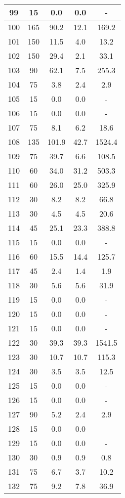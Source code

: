 \documentclass[a4paper,10pt]{article}
\begin{document}
\begin{table}
\begin{tabular}{|c|c|c|c|c|}
\hline
99 & 15 & 0.0 & 0.0 & - \\
\hline
100 & 165 & 90.2 & 12.1 & 169.2 \\
\hline
101 & 150 & 11.5 & 4.0 & 13.2 \\
\hline
102 & 150 & 29.4 & 2.1 & 33.1 \\
\hline
103 & 90 & 62.1 & 7.5 & 255.3 \\
\hline
104 & 75 & 3.8 & 2.4 & 2.9 \\
\hline
105 & 15 & 0.0 & 0.0 & - \\
\hline
106 & 15 & 0.0 & 0.0 & - \\
\hline
107 & 75 & 8.1 & 6.2 & 18.6 \\
\hline
108 & 135 & 101.9 & 42.7 & 1524.4 \\
\hline
109 & 75 & 39.7 & 6.6 & 108.5 \\
\hline
110 & 60 & 34.0 & 31.2 & 503.3 \\
\hline
111 & 60 & 26.0 & 25.0 & 325.9 \\
\hline
112 & 30 & 8.2 & 8.2 & 66.8 \\
\hline
113 & 30 & 4.5 & 4.5 & 20.6 \\
\hline
114 & 45 & 25.1 & 23.3 & 388.8 \\
\hline
115 & 15 & 0.0 & 0.0 & - \\
\hline
116 & 60 & 15.5 & 14.4 & 125.7 \\
\hline
117 & 45 & 2.4 & 1.4 & 1.9 \\
\hline
118 & 30 & 5.6 & 5.6 & 31.9 \\
\hline
119 & 15 & 0.0 & 0.0 & - \\
\hline
120 & 15 & 0.0 & 0.0 & - \\
\hline
121 & 15 & 0.0 & 0.0 & - \\
\hline
122 & 30 & 39.3 & 39.3 & 1541.5 \\
\hline
123 & 30 & 10.7 & 10.7 & 115.3 \\
\hline
124 & 30 & 3.5 & 3.5 & 12.5 \\
\hline
125 & 15 & 0.0 & 0.0 & - \\
\hline
126 & 15 & 0.0 & 0.0 & - \\
\hline
127 & 90 & 5.2 & 2.4 & 2.9 \\
\hline
128 & 15 & 0.0 & 0.0 & - \\
\hline
129 & 15 & 0.0 & 0.0 & - \\
\hline
130 & 30 & 0.9 & 0.9 & 0.8 \\
\hline
131 & 75 & 6.7 & 3.7 & 10.2 \\
\hline
132 & 75 & 9.2 & 7.8 & 36.9 \\

\end{tabular}
\end{table}
\end{document}

